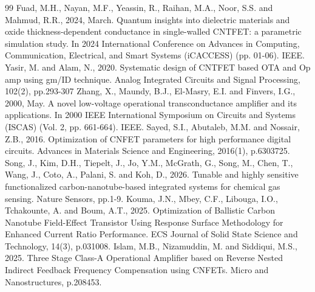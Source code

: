\begin{thebibliography}{99}
   Fuad, M.H., Nayan, M.F., Yeassin, R., Raihan, M.A., Noor, S.S. and Mahmud, R.R., 2024, March. Quantum insights into dielectric materials and oxide thickness-dependent conductance in single-walled CNTFET: a parametric simulation study. In 2024 International Conference on Advances in Computing, Communication, Electrical, and Smart Systems (iCACCESS) (pp. 01-06). IEEE.
   Yasir, M. and Alam, N., 2020. Systematic design of CNTFET based OTA and Op amp using gm/ID technique. Analog Integrated Circuits and Signal Processing, 102(2), pp.293-307
   Zhang, X., Maundy, B.J., El-Masry, E.I. and Finvers, I.G., 2000, May. A novel low-voltage operational transconductance amplifier and its applications. In 2000 IEEE International Symposium on Circuits and Systems (ISCAS) (Vol. 2, pp. 661-664). IEEE.
   Sayed, S.I., Abutaleb, M.M. and Nossair, Z.B., 2016. Optimization of CNFET parameters for high performance digital circuits. Advances in Materials Science and Engineering, 2016(1), p.6303725.
   Song, J., Kim, D.H., Tiepelt, J., Jo, Y.M., McGrath, G., Song, M., Chen, T., Wang, J., Coto, A., Palani, S. and Koh, D., 2026. Tunable and highly sensitive functionalized carbon-nanotube-based integrated systems for chemical gas sensing. Nature Sensors, pp.1-9.
   Kouma, J.N., Mbey, C.F., Libouga, I.O., Tchakounte, A. and Boum, A.T., 2025. Optimization of Ballistic Carbon Nanotube Field-Effect Transistor Using Response Surface Methodology for Enhanced Current Ratio Performance. ECS Journal of Solid State Science and Technology, 14(3), p.031008.
   Islam, M.B., Nizamuddin, M. and Siddiqui, M.S., 2025. Three Stage Class-A Operational Amplifier based on Reverse Nested Indirect Feedback Frequency Compensation using CNFETs. Micro and Nanostructures, p.208453.
\end{thebibliography}
